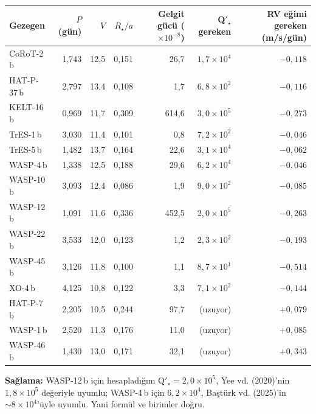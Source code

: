 \begin{center}
\small
\begin{tabular}{l r r r r r r}
\toprule
Gezegen & $P$ (gün) & $V$ & $R_\star/a$ & Gelgit gücü ($\times10^{-8}$) & Q$'_\star$ gereken & RV eğimi gereken (m/s/gün)\\
\midrule
CoRoT-2\,b  & 1,743 & 12,5 & 0,151 & 26,7  & $1{,}7\times10^4$ & $-0{,}118$\\
HAT-P-37\,b & 2,797 & 13,4 & 0,108 & 1,7   & $6{,}8\times10^2$ & $-0{,}116$\\
KELT-16\,b  & 0,969 & 11,7 & 0,309 & 614,6 & $3{,}0\times10^5$ & $-0{,}273$\\
TrES-1\,b   & 3,030 & 11,4 & 0,101 & 0,8   & $7{,}2\times10^2$ & $-0{,}046$\\
TrES-5\,b   & 1,482 & 13,7 & 0,164 & 22,6  & $3{,}1\times10^4$ & $-0{,}062$\\
WASP-4\,b   & 1,338 & 12,5 & 0,188 & 29,6  & $6{,}2\times10^4$ & $-0{,}046$\\
WASP-10\,b  & 3,093 & 12,4 & 0,086 & 1,9   & $9{,}0\times10^2$ & $-0{,}085$\\
WASP-12\,b  & 1,091 & 11,6 & 0,336 & 452,5 & $2{,}0\times10^5$ & $-0{,}263$\\
WASP-22\,b  & 3,533 & 12,0 & 0,123 & 1,2   & $2{,}3\times10^2$ & $-0{,}193$\\
WASP-45\,b  & 3,126 & 11,8 & 0,100 & 1,1   & $8{,}7\times10^1$ & $-0{,}514$\\
XO-4\,b     & 4,125 & 10,8 & 0,122 & 3,3   & $7{,}1\times10^2$ & $-0{,}144$\\
HAT-P-7\,b  & 2,205 & 10,5 & 0,244 & 97,7  & (uzuyor) & $+0{,}079$\\
WASP-1\,b   & 2,520 & 11,3 & 0,176 & 11,0  & (uzuyor) & $+0{,}085$\\
WASP-46\,b  & 1,430 & 13,0 & 0,171 & 32,1  & (uzuyor) & $+0{,}343$\\
\bottomrule
\end{tabular}
\end{center}

\textbf{Sağlama:} WASP-12\,b için hesapladığım Q$'_\star = 2{,}0\times10^5$, Yee vd. (2020)'nin
$1{,}8\times10^5$ değeriyle uyumlu; WASP-4\,b için $6{,}2\times10^4$, Baştürk vd. (2025)'in $\sim8\times10^4$'üyle
uyumlu. Yani formül ve birimler doğru.

